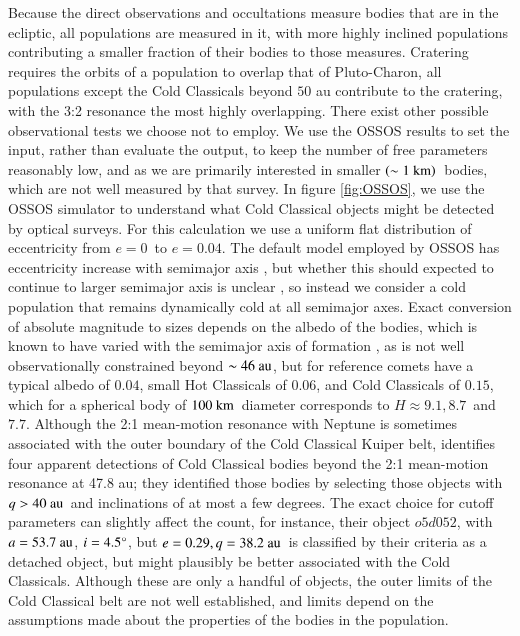 \documentclass[printer]{aa}
\newcommand{\revised}{\color{black}}
\begin{document}
{\revised Because the direct observations and occultations measure bodies that are in the ecliptic, all populations are measured in it, with more highly inclined populations contributing a smaller fraction of their bodies to those measures.  Cratering requires the orbits of a population to overlap that of Pluto-Charon, all populations except the Cold Classicals beyond $50$ au contribute to the cratering, with the 3:2 resonance the most highly overlapping.}
There exist other possible observational tests we choose not to employ.  We use the OSSOS results to set the input, rather than evaluate the output, to keep the number of free parameters reasonably low, and as we are primarily interested in smaller $\left(\sim 1~\rm{km}\right)$~bodies, which are not well measured by that survey.  In figure \ref{fig:OSSOS}, we use the OSSOS simulator \citep{2018FrASS...5...14L} to understand what Cold Classical objects might be detected by optical surveys.  For this calculation we use a uniform flat distribution of eccentricity from $e = 0$~to $e = 0.04$.  The default model employed by OSSOS has eccentricity increase with semimajor axis \citep{2011AJ....142..131P}, but whether this should expected to continue to larger semimajor axis is unclear \citep[e.g., see][]{2011ApJ...738...13B}, so instead we consider a cold population that remains dynamically cold at all semimajor axes.  Exact conversion of absolute magnitude to sizes depends on the albedo of the bodies, which is known to have varied with the semimajor axis of formation \citep{2014ApJ...782..100F}, as is not well observationally constrained beyond $\sim 46~\rm{au}$, but for reference comets have a typical albedo of $0.04$, small Hot Classicals of $0.06$, and Cold Classicals of $0.15$, which for a spherical body of $100~\rm{km}$~diameter corresponds to $H \approx 9.1, 8.7$~and $7.7$. %
Although the 2:1 mean-motion resonance with Neptune is sometimes associated with the outer boundary of the Cold Classical Kuiper belt, \citet{2018ApJS..236...18B} identifies four apparent detections of Cold Classical bodies beyond the 2:1 mean-motion resonance at 47.8 au; they identified those bodies by selecting those objects with $q > 40~\rm{au}$~and inclinations of at most a few degrees.  The exact choice for cutoff parameters can slightly affect the count, for instance, their object $o5d052$, with $a = 53.7~\rm{au}$, $i = 4.5 \degree$, but $e = 0.29, q = 38.2~\rm{au}$~is classified by their criteria as a detached object, but might plausibly be better associated with the Cold Classicals.  Although these are only a handful of objects, the outer limits of the Cold Classical belt are not well established, and limits depend on the assumptions made about the properties of the bodies in the population.
\end{document}
